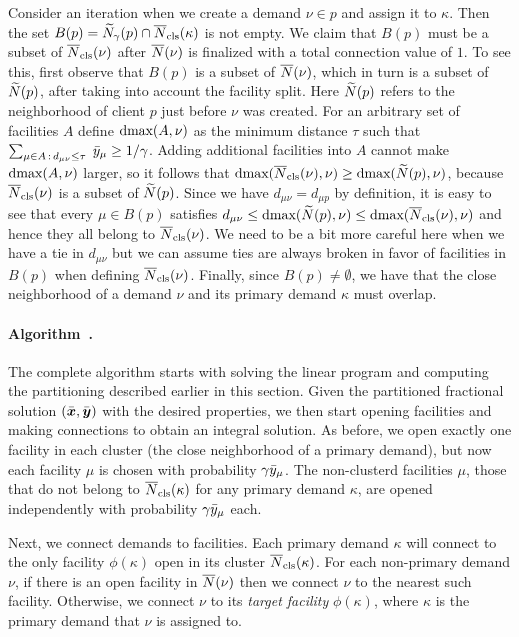 Consider an iteration when we create a demand $\nu\in p$
and assign it to $\kappa$. Then the set
$B(p)={\widetilde N}_{\gamma}(p)\cap {\overline{N}}_{\text{cls}}(\kappa)$ is not empty.
We claim that
$B(p)$ must be a subset of ${\overline{N}}_{\text{cls}}(\nu)$ after ${\overline{N}}(\nu)$ is
finalized with a total connection value of $1$. To see this, first
observe that $B(p)$ is a subset of ${\overline{N}}(\nu)$, which in turn is a
subset of ${\widetilde N}(p)$, after taking into account the facility
split. Here ${\widetilde N}(p)$ refers to the neighborhood of client $p$
just before $\nu$ was created. For an arbitrary set of facilities
$A$ define $\text{dmax}(A, \nu)$ as the minimum distance $\tau$ such
that $\sum_{\mu\in A {\,:\,} d_{\mu\nu} \leq \tau}\;{\bar y}_{\mu} \geq
1/\gamma$.
Adding additional facilities into $A$ cannot make
$\text{dmax}(A, \nu)$ larger, so it follows that $\text{dmax}({\overline{N}}_{\text{cls}}(\nu), \nu)
\geq \text{dmax}({\widetilde N}(p), \nu)$, because ${\overline{N}}_{\text{cls}}(\nu)$ is a subset of
${\widetilde N}(p)$. Since we have $d_{\mu \nu} = d_{\mu p}$ by definition,
it is easy to see that every $\mu \in B(p)$ satisfies $d_{\mu \nu}
\leq \text{dmax}({\widetilde N}(p), \nu) \leq \text{dmax}({\overline{N}}_{\text{cls}}(\nu), \nu)$ and
hence they all belong to ${\overline{N}}_{\text{cls}}(\nu)$. We need to be a bit more
careful here when we have a tie in $d_{\mu\nu}$ but we can assume ties
are always broken in favor of facilities in $B(p)$ when defining
${\overline{N}}_{\text{cls}}(\nu)$. Finally, since $B(p)\neq\emptyset$, we have that the
close neighborhood of a demand $\nu$ and its primary demand $\kappa$
must overlap.


\paragraph{Algorithm~{\EBGS}.}
The complete algorithm starts with solving the linear program and
computing the partitioning described earlier in this section.
Given the partitioned fractional solution $(\bar{\boldsymbol{x}},
\bar{\boldsymbol{y}})$ with the desired properties, we then start opening
facilities and making connections to obtain an integral
solution. As before, we open exactly one facility in each
cluster (the close neighborhood of a primary demand), but
now each facility $\mu$ is chosen with probability
$\gamma{\bar y}_{\mu}$. The non-clusterd facilities $\mu$,
those that do not belong to ${\overline{N}}_{\text{cls}}(\kappa)$ for any
primary demand $\kappa$, are opened independently with
probability $\gamma{\bar y}_{\mu}$ each. 

Next, we connect demands to facilities.
Each primary demand $\kappa$ will connect
to the only facility $\phi(\kappa)$ open in its cluster
${\overline{N}}_{\text{cls}}(\kappa)$.  For each non-primary demand $\nu$, if
there is an open facility in ${\overline{N}}(\nu)$ then we connect
$\nu$ to the nearest such facility. Otherwise, we connect
$\nu$ to its \emph{target facility} $\phi(\kappa)$, where $\kappa$ is the primary
demand that $\nu$ is assigned to. 

